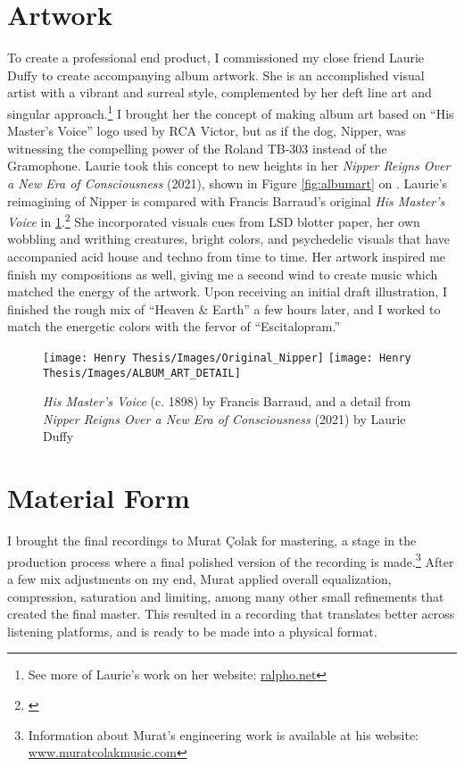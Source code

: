 \documentclass[12pt,twoside]{reedthesis}
\begin{document}
\section{Artwork}

To create a professional end product, I commissioned my close friend Laurie Duffy to create accompanying album artwork. She is an accomplished visual artist with a vibrant and surreal style, complemented by her deft line art and singular approach.\footnote{See more of Laurie's work on her website: \url{ralpho.net}} I brought her the concept of making album art based on ``His Master's Voice'' logo used by RCA Victor, but as if the dog, Nipper, was witnessing the compelling power of the Roland TB-303 instead of the Gramophone. Laurie took this concept to new heights in her \emph{Nipper Reigns Over a New Era of Consciousness} (2021), shown in Figure \ref{fig:albumart} on \pageref{fig:albumart}. Laurie's reimagining of Nipper is compared with Francis Barraud's original \emph{His Master's Voice} in \ref{fig:dogcomparis}.\footnote{\cite{barraudHMV1898}} She incorporated visuals cues from LSD blotter paper, her own wobbling and writhing creatures, bright colors, and psychedelic visuals that have accompanied acid house and techno from time to time. Her artwork inspired me finish my compositions as well, giving me a second wind to create music which matched the energy of the artwork. Upon receiving an initial draft illustration, I finished the rough mix of ``Heaven {\&} Earth'' a few hours later, and I worked to match the energetic colors with the fervor of ``Escitalopram.''

\begin{figure}[htbp]
\begin{centering} 
\texttt{[image: Henry Thesis/Images/Original\_Nipper]}
\texttt{[image: Henry Thesis/Images/ALBUM\_ART\_DETAIL]}
\caption{\emph{His Master's Voice} (c. 1898) by Francis Barraud, and a detail from \emph{Nipper Reigns Over a New Era of Consciousness} (2021) by Laurie Duffy}
\label{fig:dogcomparis}
\end{centering} 
\end{figure}


\section{Material Form}

I brought the final recordings to Murat {\c{C}}olak for mastering, a stage in the production process where a final polished version of the recording is made.\footnote{Information about Murat's engineering work is available at his website: \url{www.muratcolakmusic.com}} After a few mix adjustments on my end, Murat applied overall equalization, compression, saturation and limiting, among many other small refinements that created the final master. This resulted in a recording that translates better across listening platforms, and is ready to be made into a physical format.
\end{document}
